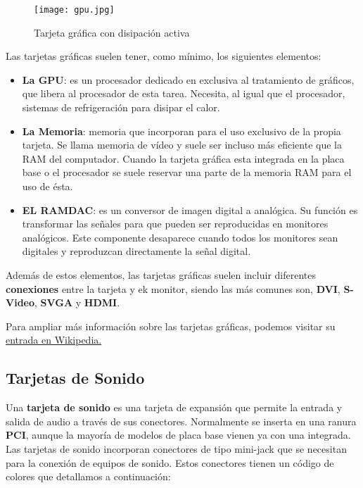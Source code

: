 \begin{figure}[ht]
    \centering
    \texttt{[image: gpu.jpg]}
    \caption{Tarjeta gráfica con disipación activa}
\end{figure}

\newpage

Las tarjetas gráficas suelen tener, como mínimo, los siguientes elementos:

\begin{itemize}
    \item \textbf{La GPU}: es un procesador dedicado en exclusiva al tratamiento de gráficos, que libera al procesador de esta tarea. Necesita, al igual que el procesador, sistemas de refrigeración para disipar el calor.

    \item \textbf{La Memoria}: memoria que incorporan para el uso exclusivo de la propia tarjeta. Se llama memoria de vídeo y suele ser incluso más eficiente que la RAM del computador. Cuando la tarjeta gráfica esta integrada en la placa base o el procesador se suele reservar una parte de la memoria RAM para el uso de ésta.

    \item \textbf{EL RAMDAC}: es un conversor de imagen digital a analógica. Su función es transformar las señales para que pueden ser reproducidas en monitores analógicos. Este componente desaparece cuando todos los monitores sean digitales y reproduzcan directamente la señal digital.
\end{itemize}

Además de estos elementos, las tarjetas gráficas suelen incluir diferentes \textbf{conexiones} entre la tarjeta y ek monitor, siendo las más comunes son, \textbf{\gls{DVI}}, \textbf{\gls{S-Video}}, \textbf{\gls{SVGA}} y \textbf{\gls{HDMI}}.

Para ampliar más información sobre las tarjetas gráficas, podemos visitar su \href{https://es.wikipedia.org/wiki/Tarjeta_gr\%C3\%A1fica}{entrada en Wikipedia.}

\subsection{Tarjetas de Sonido}
Una \textbf{tarjeta de sonido} es una tarjeta de expansión que permite la entrada y salida de audio a través de sus conectores. Normalmente se inserta en una ranura \textbf{PCI}, aunque la mayoría de modelos de placa base vienen ya con una integrada. Las tarjetas de sonido incorporan conectores de tipo mini-jack que se necesitan para la conexión de equipos de sonido. Estos conectores tienen un código de colores que detallamos a continuación:

